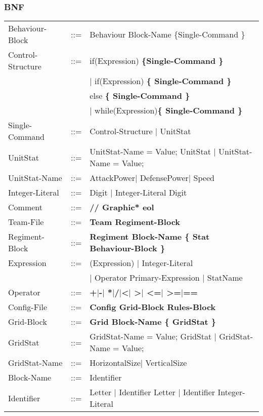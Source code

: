 	\subsubsection{BNF}
		\begin{tabular}{ l l l }
			Behaviour-Block	   &	::=	 & Behaviour Block-Name \{Single-Command \} \\
			Control-Structure  &  	::=  & if(Expression) \bf{\{}Single-Command \bf{\}}  \\
							   &		 & $\mid$ if(Expression) \bf{\{ }Single-Command \bf{\}} \\
							   &   		 & else \bf{\{ }Single-Command \bf{\} } \\					   
							   &   		 & $\mid$ while(Expression)\bf{\{ } Single-Command \bf{\}} \\
			Single-Command     &	::=  & Control-Structure $\mid$ UnitStat \\
			UnitStat		   &	::=  & UnitStat-Name = Value; UnitStat $\mid$ UnitStat-Name = Value; \\
			UnitStat-Name	   &	::=	 & AttackPower$\mid$ DefensePower$\mid$ Speed \\
			Integer-Literal    &	::=  & Digit $\mid$ Integer-Literal Digit \\
			Comment			   &	::=	 & \bf{//} Graphic* eol \\
			Team-File		   &	::=	 & \bf{Team} Regiment-Block \\
			Regiment-Block     &	::=	 & \bf{Regiment} Block-Name	 \bf{\{ } Stat Behaviour-Block \bf{\} }\\
			Expression		   &	::=  & (Expression) $\mid$ Integer-Literal \\
							   &		 &	$\mid$ Operator Primary-Expression $\mid$ StatName \\
			Operator 		   & 	::=	 & \bf{+}$\mid$\bf{-}$\mid$ \bf{*}$\mid$\bf{/}$\mid$\bf{<}$\mid$ \bf{>}$\mid$ \bf{<=}$\mid$ \bf{>=}$\mid$\bf{==}\\
			Config-File		   & 	::=  & \bf{Config} Grid-Block Rules-Block  		\\
			Grid-Block		   &	::=	 & \bf{Grid} Block-Name	 \bf{\{} GridStat \bf{\}} \\
			GridStat		   &	::=  & GridStat-Name = Value; GridStat $\mid$ GridStat-Name = Value;   \\
			GridStat-Name	   &	::=  & HorizontalSize$\mid$ VerticalSize					\\
			Block-Name		   &	::=  & Identifier							\\
			Identifier		   &    ::=  & Letter $\mid$ Identifier Letter $\mid$ Identifier Integer-Literal \\

\end{tabular}

